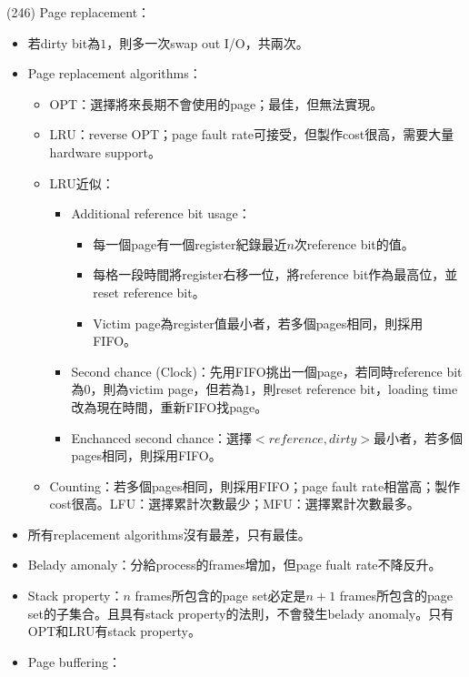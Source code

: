 \begin{theorem}{(246)} Page replacement：\begin{itemize}
        \item 若dirty bit為$1$，則多一次swap out I/O，共兩次。
        \item Page replacement algorithms：\begin{itemize}
            \item OPT：選擇將來長期不會使用的page；最佳，但無法實現。
            \item LRU：reverse OPT；page fault rate可接受，但製作cost很高，需要大量hardware support。
            \item LRU近似：\begin{itemize}
                \item Additional reference bit usage：\begin{itemize}
                    \item 每一個page有一個register紀錄最近$n$次reference bit的值。
                    \item 每格一段時間將register右移一位，將reference bit作為最高位，並reset reference bit。
                    \item Victim page為register值最小者，若多個pages相同，則採用FIFO。
                \end{itemize}
                \item Second chance (Clock)：先用FIFO挑出一個page，若同時reference bit為$0$，則為victim page，但若為$1$，則reset reference bit，loading time改為現在時間，重新FIFO找page。
                \item Enchanced second chance：選擇$<reference, dirty>$最小者，若多個pages相同，則採用FIFO。
            \end{itemize}
            \item Counting：若多個pages相同，則採用FIFO；page fault rate相當高；製作cost很高。LFU：選擇累計次數最少；MFU：選擇累計次數最多。
        \end{itemize}
        \item 所有replacement algorithms沒有最差，只有最佳。
        \item Belady amonaly：分給process的frames增加，但page fualt rate不降反升。
        \item Stack property：$n$ frames所包含的page set必定是$n + 1$ frames所包含的page set的子集合。且具有stack property的法則，不會發生belady anomaly。只有OPT和LRU有stack property。
        \item Page buffering：\begin{itemize}

\end{itemize}
\end{itemize}
\end{theorem}
